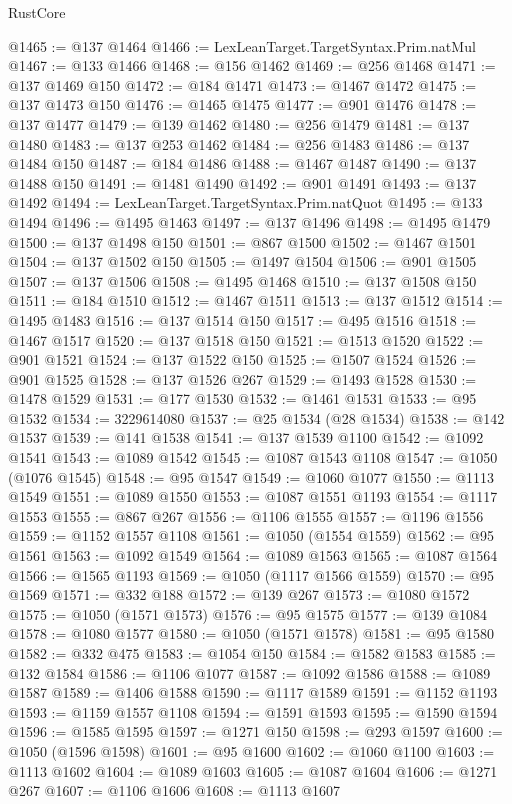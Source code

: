 \begin{lexlean}{RustCore}
\begin{coremodule}
@1465 := @137 @1464
@1466 := LexLeanTarget.TargetSyntax.Prim.natMul
@1467 := @133 @1466
@1468 := @156 @1462
@1469 := @256 @1468
@1471 := @137 @1469 @150
@1472 := @184 @1471
@1473 := @1467 @1472
@1475 := @137 @1473 @150
@1476 := @1465 @1475
@1477 := @901 @1476
@1478 := @137 @1477
@1479 := @139 @1462
@1480 := @256 @1479
@1481 := @137 @1480
@1483 := @137 @253 @1462
@1484 := @256 @1483
@1486 := @137 @1484 @150
@1487 := @184 @1486
@1488 := @1467 @1487
@1490 := @137 @1488 @150
@1491 := @1481 @1490
@1492 := @901 @1491
@1493 := @137 @1492
@1494 := LexLeanTarget.TargetSyntax.Prim.natQuot
@1495 := @133 @1494
@1496 := @1495 @1463
@1497 := @137 @1496
@1498 := @1495 @1479
@1500 := @137 @1498 @150
@1501 := @867 @1500
@1502 := @1467 @1501
@1504 := @137 @1502 @150
@1505 := @1497 @1504
@1506 := @901 @1505
@1507 := @137 @1506
@1508 := @1495 @1468
@1510 := @137 @1508 @150
@1511 := @184 @1510
@1512 := @1467 @1511
@1513 := @137 @1512
@1514 := @1495 @1483
@1516 := @137 @1514 @150
@1517 := @495 @1516
@1518 := @1467 @1517
@1520 := @137 @1518 @150
@1521 := @1513 @1520
@1522 := @901 @1521
@1524 := @137 @1522 @150
@1525 := @1507 @1524
@1526 := @901 @1525
@1528 := @137 @1526 @267
@1529 := @1493 @1528
@1530 := @1478 @1529
@1531 := @177 @1530
@1532 := @1461 @1531
@1533 := @95 @1532
@1534 := 3229614080
@1537 := @25 @1534 (@28 @1534)
@1538 := @142 @1537
@1539 := @141 @1538
@1541 := @137 @1539 @1100
@1542 := @1092 @1541
@1543 := @1089 @1542
@1545 := @1087 @1543 @1108
@1547 := @1050 (@1076 @1545)
@1548 := @95 @1547
@1549 := @1060 @1077
@1550 := @1113 @1549
@1551 := @1089 @1550
@1553 := @1087 @1551 @1193
@1554 := @1117 @1553
@1555 := @867 @267
@1556 := @1106 @1555
@1557 := @1196 @1556
@1559 := @1152 @1557 @1108
@1561 := @1050 (@1554 @1559)
@1562 := @95 @1561
@1563 := @1092 @1549
@1564 := @1089 @1563
@1565 := @1087 @1564
@1566 := @1565 @1193
@1569 := @1050 (@1117 @1566 @1559)
@1570 := @95 @1569
@1571 := @332 @188
@1572 := @139 @267
@1573 := @1080 @1572
@1575 := @1050 (@1571 @1573)
@1576 := @95 @1575
@1577 := @139 @1084
@1578 := @1080 @1577
@1580 := @1050 (@1571 @1578)
@1581 := @95 @1580
@1582 := @332 @475
@1583 := @1054 @150
@1584 := @1582 @1583
@1585 := @132 @1584
@1586 := @1106 @1077
@1587 := @1092 @1586
@1588 := @1089 @1587
@1589 := @1406 @1588
@1590 := @1117 @1589
@1591 := @1152 @1193
@1593 := @1159 @1557 @1108
@1594 := @1591 @1593
@1595 := @1590 @1594
@1596 := @1585 @1595
@1597 := @1271 @150
@1598 := @293 @1597
@1600 := @1050 (@1596 @1598)
@1601 := @95 @1600
@1602 := @1060 @1100
@1603 := @1113 @1602
@1604 := @1089 @1603
@1605 := @1087 @1604
@1606 := @1271 @267
@1607 := @1106 @1606
@1608 := @1113 @1607

\end{coremodule}
\end{lexlean}
